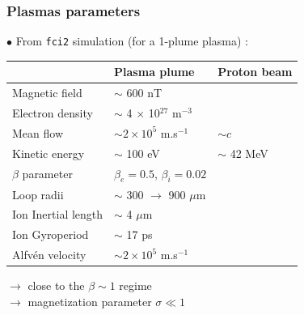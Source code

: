 \documentclass{beamer}
\begin{document}
\begin{frame}
\frametitle{Plasmas parameters}

$\bullet$ From \texttt{fci2} simulation (for a 1-plume plasma) :

\begin{center}
\begin{tabular}{lll}
\hline
\hline
& Plasma plume & Proton beam \hspace{2.0cm}\\
\hline
Magnetic field             & $\sim$ 600 nT                              & \\
Electron density           & $\sim$ 4 $\times$ 10$^{27}$ m$^{-3}$       & \\
Mean flow                  & $\sim 2 \times 10^5$ m.s$^{-1}$            & $\sim c$ \\
Kinetic energy             & $\sim$ 100 eV                              & $\sim$ 42 MeV \\
$\beta$ parameter          & $\beta_e = 0.5$, $\beta_i = 0.02$          & \\
Loop radii                 & $\sim$ 300 $\to$ 900 $\mu$m                & \\
Ion Inertial length        & $\sim$ 4 $\mu$m                            & \\
Ion Gyroperiod             & $\sim$ 17 ps                               & \\
Alfvén velocity            & $\sim 2 \times 10^5$ m.s$^{-1}$            & \\
\hline
\hline
\end{tabular}
\end{center}

$\to$ close to the $\beta \sim 1$ regime \\
$\to$ magnetization parameter $\sigma \ll 1$ \\

\end{frame}
\end{document}
